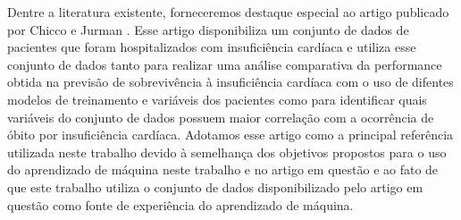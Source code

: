 Dentre a literatura existente, forneceremos destaque especial ao artigo publicado por Chicco e Jurman \cite{chicco2020}. Esse artigo disponibiliza um conjunto de dados de pacientes que foram hospitalizados com insuficiência cardíaca \cite{larxel_dataset} e utiliza esse conjunto de dados tanto para realizar uma análise comparativa da performance obtida na previsão de sobrevivência à insuficiência cardíaca com o uso de difentes modelos de treinamento e variáveis dos pacientes como para identificar quais variáveis do conjunto de dados possuem maior correlação com a ocorrência de óbito por insuficiência cardíaca. Adotamos esse artigo como a principal referência utilizada neste trabalho devido à semelhança dos objetivos propostos para o uso do aprendizado de máquina neste trabalho e no artigo em questão e ao fato de que este trabalho utiliza o conjunto de dados disponibilizado pelo artigo em questão como fonte de experiência do aprendizado de máquina.
